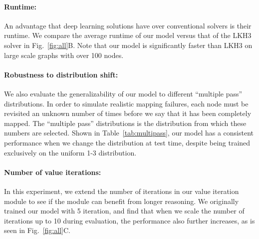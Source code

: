 \vspace{-0.1in}
\paragraph{Runtime:} An  advantage that deep learning solutions have over conventional
solvers is their runtime. We compare the average runtime of our model versus that of the LKH3
solver in Fig.~\ref{fig:all}B. Note that our model is significantly faster than LKH3 on large
scale graphs with over 100 nodes.

\vspace{-0.1in}
\paragraph{Robustness to distribution shift:} We also evaluate the generalizability of our model to
different ``multiple pass'' distributions. In order to simulate realistic mapping failures, each
node must be revisited an unknown number of times before we say that it has been completely mapped.
The ``multiple pass'' distributions is the distribution from which these numbers are selected.
Shown in Table~\ref{tab:multipass}, our model has a
consistent performance when we change the distribution at test time, despite being trained
exclusively on the uniform 1-3 distribution.



\vspace{-0.1in}
\paragraph{Number of value iterations:}
In this experiment, we extend the number of iterations in our value iteration module to see if the
module can benefit from longer reasoning. We originally trained our model with 5 iteration, and find
that when we scale the number of iterations up to 10 during evaluation, the performance also further
increases, as is seen in Fig.~\ref{fig:all}C.



\vspace{-0.1in}
